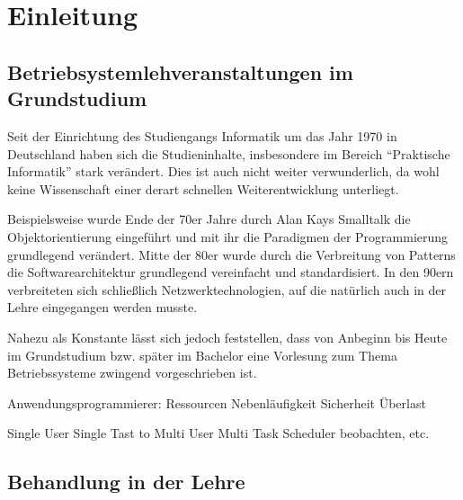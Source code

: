 \chapter{Einleitung}
\label{chap:introduction}


\section{Betriebsystemlehveranstaltungen im Grundstudium}
\label{sec:motivation}

		Seit der Einrichtung des Studiengangs Informatik um das Jahr 1970 in Deutschland haben sich die Studieninhalte, insbesondere im Bereich "`Praktische Informatik"' stark verändert.
		Dies ist auch nicht weiter verwunderlich, da wohl keine Wissenschaft einer derart schnellen Weiterentwicklung unterliegt.

		Beispielsweise wurde Ende der 70er Jahre durch Alan Kays Smalltalk die Objektorientierung eingeführt und mit ihr die Paradigmen der Programmierung grundlegend verändert.
		Mitte der 80er wurde durch die Verbreitung von Patterns die Softwarearchitektur grundlegend vereinfacht und standardisiert.
		In den 90ern verbreiteten sich schließlich Netzwerktechnologien, auf die natürlich auch in der Lehre eingegangen werden musste.

		Nahezu als Konstante lässt sich jedoch feststellen, dass von Anbeginn bis Heute im Grundstudium bzw. später im Bachelor eine Vorlesung zum Thema Betriebssysteme zwingend vorgeschrieben ist. 

		Anwendungsprogrammierer:
			Ressourcen
			Nebenläufigkeit
			Sicherheit
			Überlast


		Single User Single Tast to Multi User Multi Task Scheduler beobachten, etc.



\section{Behandlung in der Lehre}
\label{sec:teaching}


